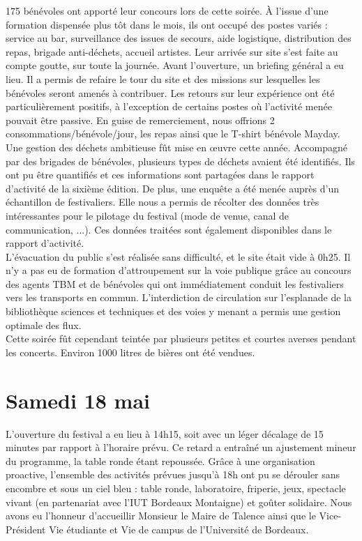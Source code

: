 \documentclass[12pt,a4paper]{report}
\begin{document}
175 bénévoles ont apporté leur concours lors de cette soirée. À l'issue d'une formation dispensée plus tôt dans le mois, ils ont occupé des postes variés : service au bar, surveillance des issues de secours, aide logistique, distribution des repas, brigade anti-déchets, accueil artistes. Leur arrivée sur site s'est faite au compte goutte, sur toute la journée. Avant l'ouverture, un briefing général a eu lieu. Il a permis de refaire le tour du site et des missions sur lesquelles les bénévoles seront amenés à contribuer. Les retours sur leur expérience ont été particulièrement positifs, à l'exception de certains postes où l'activité menée pouvait être passive. En guise de remerciement, nous offrions 2 consommations/bénévole/jour, les repas ainsi que le T-shirt bénévole Mayday.\\

Une gestion des déchets ambitieuse fût mise en œuvre cette année. Accompagné par des brigades de bénévoles, plusieurs types de déchets avaient été identifiés. Ils ont pu être quantifiés et ces informations sont partagées dans le rapport d'activité de la sixième édition. De plus, une enquête a été menée auprès d'un échantillon de festivaliers. Elle nous a permis de récolter des données très intéressantes pour le pilotage du festival (mode de venue, canal de communication, ...). Ces données traitées sont également disponibles dans le rapport d'activité.\\

L'évacuation du public s'est réalisée sans difficulté, et le site était vide à 0h25. Il n'y a pas eu de formation d'attroupement sur la voie publique grâce au concours des agents TBM et de bénévoles qui ont immédiatement conduit les festivaliers vers les transports en commun. L'interdiction de circulation sur l'esplanade de la bibliothèque sciences et techniques et des voies y menant a permis une gestion optimale des flux.\\

Cette soirée fût cependant teintée par plusieurs petites et courtes averses pendant les concerts. Environ 1000 litres de bières ont été vendues.

\section{Samedi 18 mai}

L'ouverture du festival a eu lieu à 14h15, soit avec un léger décalage de 15 minutes par rapport à l'horaire prévu. Ce retard a entraîné un ajustement mineur du programme, la table ronde étant repoussée. Grâce à une organisation proactive, l'ensemble des activités prévues jusqu'à 18h ont pu se dérouler sans encombre et sous un ciel bleu : table ronde, laboratoire, friperie, jeux, spectacle vivant (en partenariat avec l'IUT Bordeaux Montaigne) et goûter solidaire. Nous avons eu l'honneur d'accueillir Monsieur le Maire de Talence ainsi que le Vice-Président Vie étudiante et Vie de campus de l'Université de Bordeaux.\\
\end{document}
